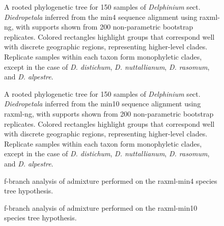 \documentclass[11pt]{article}
\begin{document}
\begin{figure}[p]
	\centering
	\caption{
		A rooted phylogenetic tree for 150 samples of \emph{Delphinium} sect. \emph{Diedropetala}
		inferred from the min4 sequence alignment using raxml-ng, with supports shown from
		200 non-parametric bootstrap replicates. 
		Colored rectangles highlight
		groups that correspond well with discrete geographic regions, representing higher-level 
		clades. Replicate samples within each taxon form monophyletic clades, except in the case
		of \emph{D. distichum}, \emph{D. nuttallianum}, \emph{D. rasomum}, and \emph{D. alpestre}.
	}
	\label{fig:S2}
\end{figure}

\begin{figure}[p]
	\centering
	\caption{
		A rooted phylogenetic tree for 150 samples of \emph{Delphinium} sect. \emph{Diedropetala}
		inferred from the min10 sequence alignment using raxml-ng, with supports shown from
		200 non-parametric bootstrap replicates. 
		Colored rectangles highlight
		groups that correspond well with discrete geographic regions, representing higher-level 
		clades. Replicate samples within each taxon form monophyletic clades, except in the case
		of \emph{D. distichum}, \emph{D. nuttallianum}, \emph{D. rasomum}, and \emph{D. alpestre}.
	}
	\label{fig:S3}
\end{figure}


\begin{figure}[p]
	\centering
	\caption{
		f-branch analysis of admixture performed on the raxml-min4 species tree hypothesis.	
	}
	\label{fig:S4}
\end{figure}

\begin{figure}[p]
	\centering
	\caption{
		f-branch analysis of admixture performed on the raxml-min10 species tree hypothesis.
	}
	\label{fig:S5}
\end{figure}
\end{document}
